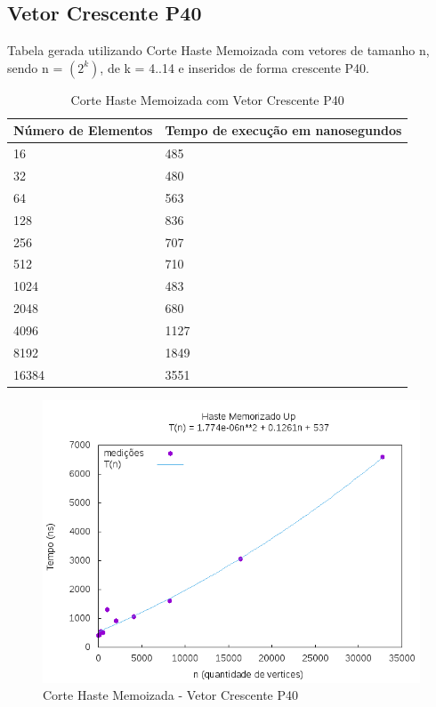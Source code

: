 \documentclass[12pt,a4paper,twoside]{report}
\begin{document}
\subsection{Vetor Crescente P40}
Tabela gerada utilizando Corte Haste Memoizada com vetores de tamanho n, sendo n = $(2^k)$, de k = 4..14 e inseridos de forma crescente P40.
\begin{table}[H]
\centering
\caption{Corte Haste Memoizada com Vetor Crescente P40}
\label{my-label}
\begin{tabular}{|l|l|}
\hline
\multicolumn{1}{|c|}{\textbf{Número de Elementos}} & \multicolumn{1}{c|}{\textbf{Tempo de execução em nanosegundos}} \\ \hline
16 & 485 \\ \hline
32 & 480 \\ \hline
64 & 563 \\ \hline
128 & 836 \\ \hline
256 & 707 \\ \hline
512 & 710 \\ \hline
1024 & 483 \\ \hline
2048 & 680 \\ \hline
4096 & 1127 \\ \hline
8192 & 1849 \\ \hline
16384 & 3551 \\ \hline
\end{tabular}
\end{table}

\begin{figure}[H]
    \centering
    \includegraphics[width=0.7\linewidth]{graficos/CorteHasteMemorizado/CrescenteP40/HasteMemo.png}
  \caption{Corte Haste Memoizada - Vetor Crescente P40}
\end{figure}
\end{document}
